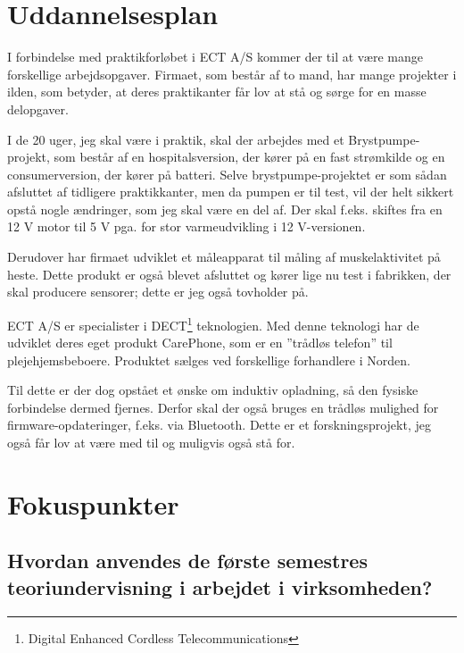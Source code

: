 
\raggedbottom


\tableofcontents*

\chapter{Uddannelsesplan}

I forbindelse med praktikforløbet i ECT A/S kommer der til at være mange forskellige arbejdsopgaver. Firmaet, som består af to mand, har mange projekter i ilden, som betyder, at deres praktikanter får lov at stå og sørge for en masse delopgaver. 

I de 20 uger, jeg skal være i praktik, skal der arbejdes med et Brystpumpe-projekt, som består af en hospitalsversion, der kører på en fast strømkilde og en consumerversion, der kører på batteri. Selve brystpumpe-projektet er som sådan afsluttet af tidligere praktikkanter, men da pumpen er til test, vil der helt sikkert opstå nogle ændringer, som jeg skal være en del af. Der skal f.eks. skiftes fra en 12 V motor til 5 V pga. for stor varmeudvikling i 12 V-versionen.

Derudover har firmaet udviklet et måleapparat til måling af muskelaktivitet på heste. Dette produkt er også blevet afsluttet og kører lige nu test i fabrikken, der skal producere sensorer; dette er jeg også tovholder på.

ECT A/S er specialister i DECT\footnote{Digital Enhanced Cordless Telecommunications} teknologien. Med denne teknologi har de udviklet deres eget produkt CarePhone, som er en ''trådløs telefon'' til plejehjemsbeboere. Produktet sælges ved forskellige forhandlere i Norden.


Til dette er der dog opstået et ønske om induktiv opladning, så den fysiske forbindelse dermed fjernes. Derfor skal der også bruges en trådløs mulighed for firmware-opdateringer, f.eks. via Bluetooth. Dette er et forskningsprojekt, jeg også får lov at være med til og muligvis også stå for.

\chapter{Fokuspunkter}

\section*{Hvordan anvendes de første semestres teoriundervisning i arbejdet i virksomheden?}

